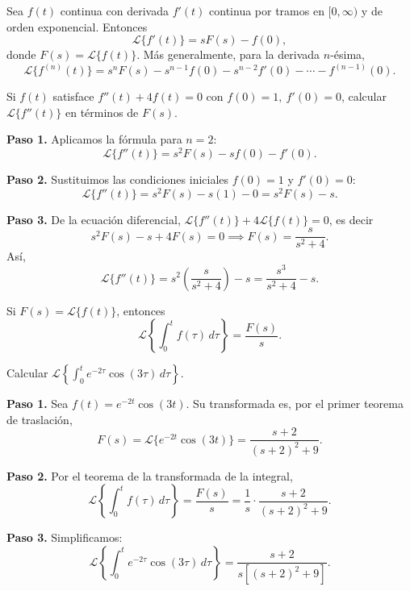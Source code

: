 \begin{theorem}
Sea $f(t)$ continua con derivada $f'(t)$ continua por tramos en $[0,\infty)$ y de orden exponencial. Entonces
\[
\mathcal{L}\{f'(t)\} = s F(s) - f(0),
\]
donde $F(s)=\mathcal{L}\{f(t)\}$. Más generalmente, para la derivada $n$-ésima,
\[
\mathcal{L}\{f^{(n)}(t)\} = s^n F(s) - s^{n-1}f(0) - s^{n-2}f'(0) - \cdots - f^{(n-1)}(0).
\]
\end{theorem}

\begin{example}
Si $f(t)$ satisface $f''(t)+4f(t)=0$ con $f(0)=1,\ f'(0)=0$, calcular $\mathcal{L}\{f''(t)\}$ en términos de $F(s)$.
\begin{myproof}
\textbf{Paso 1.} Aplicamos la fórmula para $n=2$:
\[
\mathcal{L}\{f''(t)\} = s^2 F(s) - s f(0) - f'(0).
\]

\textbf{Paso 2.} Sustituimos las condiciones iniciales $f(0)=1$ y $f'(0)=0$:
\[
\mathcal{L}\{f''(t)\} = s^2 F(s) - s(1) - 0 = s^2 F(s) - s.
\]

\textbf{Paso 3.} De la ecuación diferencial, $\mathcal{L}\{f''(t)\} + 4\mathcal{L}\{f(t)\}=0$, es decir
\[
s^2 F(s) - s + 4F(s)=0 \implies F(s)=\frac{s}{s^2+4}.
\]
Así,
\[
\boxed{\mathcal{L}\{f''(t)\} = s^2\left(\frac{s}{s^2+4}\right) - s = \frac{s^3}{s^2+4} - s.}
\]
\end{myproof}
\end{example}

\begin{theorem}
Si $F(s)=\mathcal{L}\{f(t)\}$, entonces
\[
\mathcal{L}\left\{\int_0^t f(\tau)\,d\tau\right\} = \frac{F(s)}{s}.
\]
\end{theorem}

\begin{example}
Calcular $\mathcal{L}\left\{\int_0^t e^{-2\tau}\cos(3\tau)\,d\tau\right\}$.
\begin{myproof}
\textbf{Paso 1.} Sea $f(t)=e^{-2t}\cos(3t)$. Su transformada es, por el primer teorema de traslación,
\[
F(s)=\mathcal{L}\{e^{-2t}\cos(3t)\} = \frac{s+2}{(s+2)^2+9}.
\]

\textbf{Paso 2.} Por el teorema de la transformada de la integral,
\[
\mathcal{L}\left\{\int_0^t f(\tau)\,d\tau\right\} = \frac{F(s)}{s} = \frac{1}{s}\cdot \frac{s+2}{(s+2)^2+9}.
\]

\textbf{Paso 3.} Simplificamos:
\[
\boxed{\mathcal{L}\left\{\int_0^t e^{-2\tau}\cos(3\tau)\,d\tau\right\} = \frac{s+2}{s[(s+2)^2+9]}.}
\]
\end{myproof}
\end{example}

